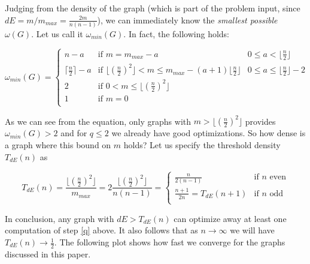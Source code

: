 \documentclass[a4paper]{article}
\begin{document}
Judging from the density of the graph (which is part of the problem input, since $dE = m/m_{max} = \frac{2m}{n(n-1)}$), we can immediately know the \emph{smallest possible} $\omega(G)$. Let us call it $\omega_{min}(G)$. In fact, the following holds:

\begin{equation}\label{omega}
\omega_{min}(G) = \left\{ \begin{array}{lll}
                           n - a & \text{if } m = m_{max} - a & 0 \leq a < \lfloor\frac{n}{2}\rfloor \\
                           \lceil\frac{n}{2}\rceil - a & \text{if } \lfloor(\frac{n}{2})^2\rfloor < m \leq m_{max} - (a + 1)\lfloor\frac{n}{2}\rfloor & 0 \leq a \leq \lfloor\frac{n}{2}\rfloor - 2 \\
                           2 & \text{if } 0 < m \leq \lfloor(\frac{n}{2})^2\rfloor & \\
                           1 & \text{if } m = 0 & \\
                          \end{array}
                  \right.
\end{equation}

As we can see from the equation, only graphs with $m > \lfloor(\frac{n}{2})^2\rfloor$ provides $\omega_{min}(G) > 2$ and for $q \leq 2$ we already have good optimizations. So how dense is a graph where this bound on $m$ holds? Let us specify the threshold density $T_{dE}(n)$ as

$$
T_{dE}(n) = \frac{\lfloor(\frac{n}{2})^2\rfloor}{m_{max}} = 2\frac{\lfloor(\frac{n}{2})^2\rfloor}{n(n-1)} = \left\{ \begin{array}{ll}
          \frac{n}{2(n-1)} & \text{if } n \text{ even}\\
          \frac{n + 1}{2n} = T_{dE}(n+1) & \text{if } n \text{ odd}\\
          \end{array}
  \right.
$$

In conclusion, any graph with $dE > T_{dE}(n)$ can optimize away at least one computation of step \ref{q} above. It also follows that as $n \rightarrow \infty$ we will have $T_{dE}(n) \rightarrow \frac{1}{2}$. The following plot shows how fast we converge for the graphs discussed in this paper.

\begin{center}
\end{center}
\end{document}
